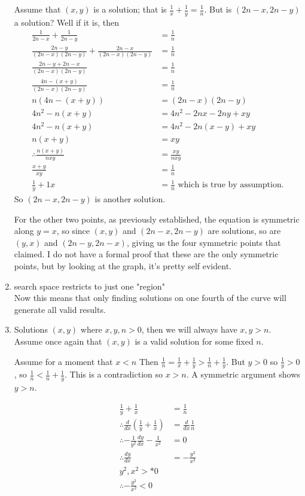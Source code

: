 \documentclass[11pt, oneside]{article}   	%
\begin{document}
\begin{enumerate}
    Assume that $(x,y)$ is a solution; that is $\frac1x + \frac 1y=\frac 1n$. But is $(2n-x,2n-y)$ a solution? Well if it is, then
    \begin{align*}
      \frac1{2n-x}+\frac1{2n-y}&=\frac 1n\\
      \frac{2n-y}{(2n-x)(2n-y)} + \frac{2n-x}{(2n-x)(2n-y)}&=\frac 1n\\
      \frac{2n-y + 2n-x}{(2n-x)(2n-y)}&=\frac 1n\\
      \frac{4n-(x + y)}{(2n-x)(2n-y)}&=\frac 1n\\
      n(4n-(x+y))&=(2n-x)(2n-y)\\
      4n^2-n(x+y)&=4n^2-2nx-2ny + xy\\
      4n^2-n(x+y)&=4n^2-2n(x-y) + xy\\
      n(x+y)&=xy\\
      \therefore \frac{n(x+y)}{nxy}&=\frac{xy}{nxy}\\
      \frac{x+y}{xy}&=\frac{1}{n}\\
      \frac1y+1x&=\frac1n \text{ which is true by assumption.}
    \end{align*}
    So $(2n-x,2n-y)$ is another solution.

    For the other two points, as previously established, the equation is symmetric along $y=x$, so since $(x,y)$ and $(2n-x,2n-y)$ are solutions, so are $(y,x)$ and $(2n-y,2n-x)$,
    giving us the four symmetric points that claimed. I do not have a formal proof that these are the only symmetric points, but by looking at the graph, it's pretty self evident.

  \item search space restricts to just one "region"\\
  Now this means that only finding solutions on one fourth of the curve will generate all valid results.  

  \item Solutions $(x,y)$ where $x,y,n > 0$, then we will always have $x,y > n$.\\
    Assume once again that $(x,y)$ is a valid solution for some fixed $n$.
    
    Assume for a moment that $x < n$ Then $\frac 1n = \frac 1x + \frac 1y > \frac 1n + \frac 1y$. But $y> 0$ so $\frac 1y > 0$, so $\frac 1n < \frac 1n+\frac 1y$.
    This is a contradiction so $x > n$. A symmetric argument shows $y > n$.

    \begin{align*}
      \frac 1y + \frac 1x &= \frac 1n\\
      \therefore \frac d{dx}\left(\frac 1y + \frac 1x\right) &= \frac d{dx}\frac 1n\\
      \therefore -\frac 1{y^2}\frac{dy}{dx} - \frac 1{x^2}&=0\\
      \therefore \frac{dy}{dx}&=-\frac{y^2}{x^2}\\
      y^2,x^2 >* 0\\
      \therefore -\frac{y^2}{x^2} < 0
    \end{align*}
    


\end{enumerate}
\end{document}
